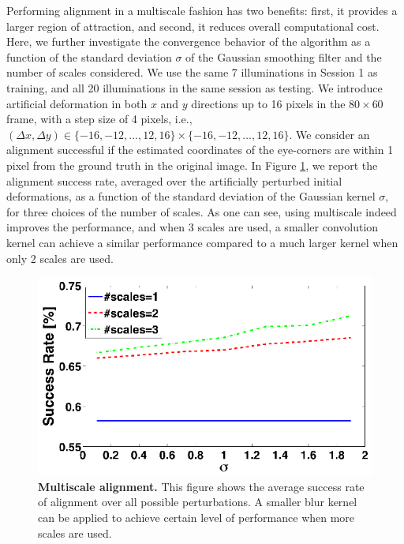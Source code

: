 \documentclass[10pt,journal,letterpaper,compsoc]{IEEEtran}
\begin{document}
Performing alignment in a multiscale fashion has two benefits: first, it provides a larger region of attraction, and second, it reduces overall computational cost. Here, we further investigate the convergence behavior of the algorithm as a function of the standard deviation $\sigma$ of the Gaussian smoothing filter and the number of scales considered.
We use the same 7 illuminations in
Session 1 as training, and all 20 illuminations in the same
session as testing. We introduce artificial deformation in
both $x$ and $y$ directions up to 16 pixels in the
$80\times 60$ frame, with a step size of 4 pixels, i.e.,
$(\Delta x, \Delta y) \in \{-16,-12,\ldots,12,16\} \times
\{-16,-12,\ldots,12,16\}$. We consider an alignment
successful if the estimated coordinates of the eye-corners
are within 1 pixel from the ground truth in the original
image.  In Figure \ref{fig:multiscale}, we report the
alignment success rate, averaged over the artificially
perturbed initial deformations, as a function of the
standard deviation of the Gaussian kernel $\sigma$, for
three choices of the number of scales. As one can see,
using multiscale indeed improves the performance, and when
3 scales are used, a smaller convolution kernel can achieve
a similar performance compared to a much larger kernel when
only 2 scales are used.
\begin{figure}
\centering
\includegraphics{Figure_4}
\vspace{-2mm}
\caption{{\bf Multiscale alignment.} This figure shows the average success rate of alignment over all possible perturbations. A smaller blur kernel can be applied to achieve certain level of performance when more scales are used.}
\label{fig:multiscale}
\vspace{-2mm}
\end{figure}
\end{document}
